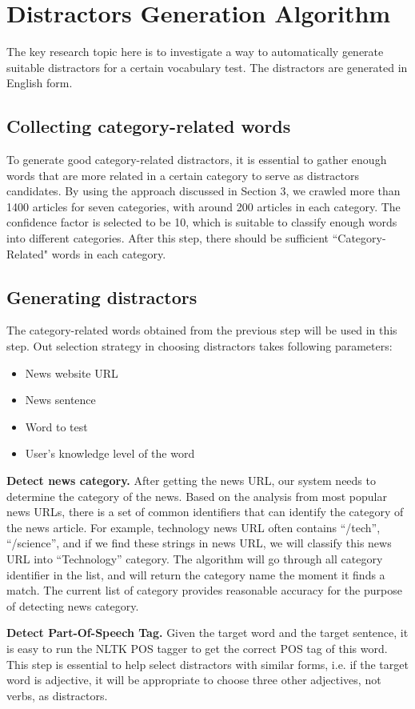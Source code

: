 \section{Distractors Generation Algorithm}
The key research topic here is to investigate a way to automatically generate suitable distractors for a certain vocabulary test. The distractors are generated in English form.
\subsection{Collecting category-related words}
To generate good category-related distractors, it is essential to gather enough words that are more related in a certain category to serve as distractors candidates. By using the approach discussed in Section 3, we crawled more than 1400 articles for seven categories, with around 200 articles in each category. The confidence factor is selected to be 10, which is suitable to classify enough words into different categories. After this step, there should be sufficient “Category-Related" words in each category.

\subsection{Generating distractors}
The category-related words obtained from the previous step will be used in this step. Out selection strategy in choosing distractors takes following parameters:
\begin{itemize}
\item News website URL
\item News sentence
\item Word to test
\item User’s knowledge level of the word
\end{itemize}
{\bf Detect news category.}
After getting the news URL, our system needs to determine the category of the news. Based on the analysis from most popular news URLs, there is a set of common identifiers that can identify the category of the news article. For example, technology news URL often contains “/tech”, “/science”, and if we find these strings in news URL, we will classify this news URL into “Technology” category. The algorithm will go through all category identifier in the list, and will return the category name the moment it finds a match. The current list of category provides reasonable accuracy for the purpose of detecting news category.

{\bf Detect Part-Of-Speech Tag.}
Given the target word and the target sentence, it is easy to run the NLTK POS tagger to get the correct POS tag of this word. This step is essential to help select distractors with similar forms, i.e. if the target word is adjective, it will be appropriate to choose three other adjectives, not verbs, as distractors.

